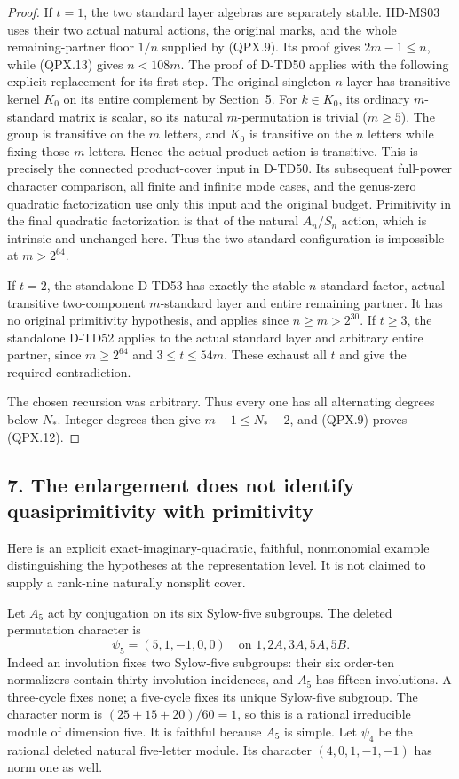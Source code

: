 \begin{proof}
If \(t=1\), the two standard layer algebras are
separately stable. HD-MS03 uses their two actual
natural actions, the original marks, and the whole
remaining-partner floor \(1/n\) supplied by (QPX.9).
Its proof gives \(2m-1\le n\), while (QPX.13) gives
\(n<108m\). The proof of D-TD50 applies with the
following explicit replacement for its first step.
The original singleton \(n\)-layer has transitive
kernel \(K_0\) on its entire complement by Section~5.
For \(k\in K_0\), its ordinary \(m\)-standard matrix
is scalar, so its natural \(m\)-permutation is trivial
(\(m\ge5\)). The group is transitive on the \(m\)
letters, and \(K_0\) is transitive on the \(n\)
letters while fixing those \(m\) letters. Hence the
actual product action is transitive. This is precisely
the connected product-cover input in D-TD50.
Its subsequent full-power character comparison, all
finite and infinite mode cases, and the genus-zero
quadratic factorization use only this input and the
original budget. Primitivity in the final quadratic
factorization is that of the natural \(A_n/S_n\)
action, which is intrinsic and unchanged here.
Thus the two-standard configuration is impossible
at \(m>2^{64}\).

If \(t=2\), the standalone D-TD53 has exactly the
stable \(n\)-standard factor, actual transitive
two-component \(m\)-standard layer and entire remaining
partner. It has no original primitivity hypothesis,
and applies since \(n\ge m>2^{30}\).
If \(t\ge3\), the standalone D-TD52 applies to the
actual standard layer and arbitrary entire partner,
since \(m\ge2^{64}\) and \(3\le t\le54m\).
These exhaust all \(t\) and give the required contradiction.

The chosen recursion was arbitrary. Thus every one
has all alternating degrees below \(N_*\). Integer
degrees then give \(m-1\le N_*-2\), and (QPX.9)
proves (QPX.12).
\end{proof}

\subsection*{7. The enlargement does not identify quasiprimitivity with primitivity}

Here is an explicit exact-imaginary-quadratic, faithful,
nonmonomial example distinguishing the hypotheses at the
representation level. It is not claimed to supply a
rank-nine naturally nonsplit cover.

Let \(A_5\) act by conjugation on its six Sylow-five
subgroups. The deleted permutation character is
\[
       \psi_5=(5,1,-1,0,0)
       \quad\text{on }1,2A,3A,5A,5B.
 \tag{QPX.15}
\]
Indeed an involution fixes two Sylow-five subgroups:
their six order-ten normalizers contain thirty
involution incidences, and \(A_5\) has fifteen
involutions. A three-cycle fixes none; a five-cycle
fixes its unique Sylow-five subgroup. The character
norm is \((25+15+20)/60=1\), so this is a rational
irreducible module of dimension five. It is faithful
because \(A_5\) is simple. Let \(\psi_4\) be the
rational deleted natural five-letter module.
Its character \((4,0,1,-1,-1)\) has norm one as well.

